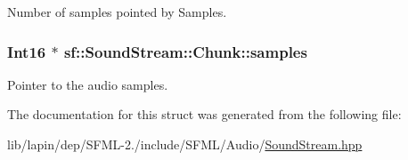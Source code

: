 Number of samples pointed by Samples. 

\hypertarget{structsf_1_1_sound_stream_1_1_chunk_ae0b301e2bdfc530a6dc9efeac7e8a2e7}{
\subsubsection[{samples}]{ {\bf Int16} $\ast$ sf\-::\-Sound\-Stream\-::\-Chunk\-::samples}}\label{structsf_1_1_sound_stream_1_1_chunk_ae0b301e2bdfc530a6dc9efeac7e8a2e7}


Pointer to the audio samples. 



The documentation for this struct was generated from the following file\-:\begin{DoxyCompactItemize}
\item 
lib/lapin/dep/\-S\-F\-M\-L-\/2./include/\-S\-F\-M\-L/\-Audio/\hyperlink{lapin_2dep_2_s_f_m_l-2_83_2include_2_s_f_m_l_2_audio_2_sound_stream_8hpp}{Sound\-Stream.\-hpp}\end{DoxyCompactItemize}
